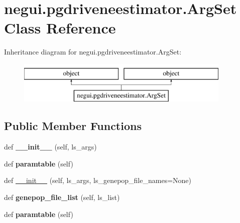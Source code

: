 \hypertarget{classnegui_1_1pgdriveneestimator_1_1ArgSet}{}\section{negui.\+pgdriveneestimator.\+Arg\+Set Class Reference}
\label{classnegui_1_1pgdriveneestimator_1_1ArgSet}
Inheritance diagram for negui.\+pgdriveneestimator.\+Arg\+Set\+:\begin{figure}[H]
\begin{center}
\leavevmode
\includegraphics[height=2.000000cm]{classnegui_1_1pgdriveneestimator_1_1ArgSet}
\end{center}
\end{figure}
\subsection*{Public Member Functions}
\begin{DoxyCompactItemize}
\item 
def {\bfseries \+\_\+\+\_\+init\+\_\+\+\_\+} (self, ls\+\_\+args)\hypertarget{classnegui_1_1pgdriveneestimator_1_1ArgSet_af41ba3f691a99548b2027d2d57015535}{}\label{classnegui_1_1pgdriveneestimator_1_1ArgSet_af41ba3f691a99548b2027d2d57015535}

\item 
def {\bfseries paramtable} (self)\hypertarget{classnegui_1_1pgdriveneestimator_1_1ArgSet_a2634d9f265444166815a47bc3a9c8baf}{}\label{classnegui_1_1pgdriveneestimator_1_1ArgSet_a2634d9f265444166815a47bc3a9c8baf}

\item 
def \hyperlink{classnegui_1_1pgdriveneestimator_1_1ArgSet_af060777f11e812d8a1a55b7b1b66cde3}{\+\_\+\+\_\+init\+\_\+\+\_\+} (self, ls\+\_\+args, ls\+\_\+genepop\+\_\+file\+\_\+names=None)
\item 
def {\bfseries genepop\+\_\+file\+\_\+list} (self, ls\+\_\+list)\hypertarget{classnegui_1_1pgdriveneestimator_1_1ArgSet_ae7bf0e1f77c767849fce3e17733cb0b0}{}\label{classnegui_1_1pgdriveneestimator_1_1ArgSet_ae7bf0e1f77c767849fce3e17733cb0b0}

\item 
def {\bfseries paramtable} (self)\hypertarget{classnegui_1_1pgdriveneestimator_1_1ArgSet_a2634d9f265444166815a47bc3a9c8baf}{}\label{classnegui_1_1pgdriveneestimator_1_1ArgSet_a2634d9f265444166815a47bc3a9c8baf}

\end{DoxyCompactItemize}
